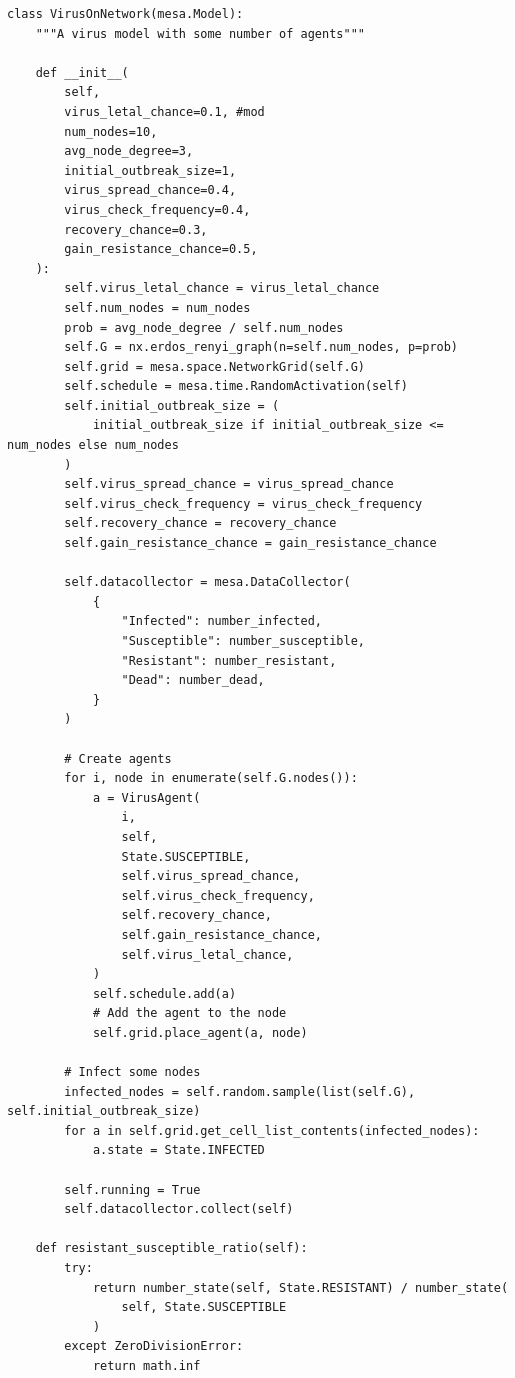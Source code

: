\begin{verbatim}
class VirusOnNetwork(mesa.Model):
    """A virus model with some number of agents"""

    def __init__(
        self,
        virus_letal_chance=0.1, #mod
        num_nodes=10,
        avg_node_degree=3,
        initial_outbreak_size=1,
        virus_spread_chance=0.4,
        virus_check_frequency=0.4,
        recovery_chance=0.3,
        gain_resistance_chance=0.5,
    ):
        self.virus_letal_chance = virus_letal_chance
        self.num_nodes = num_nodes
        prob = avg_node_degree / self.num_nodes
        self.G = nx.erdos_renyi_graph(n=self.num_nodes, p=prob)
        self.grid = mesa.space.NetworkGrid(self.G)
        self.schedule = mesa.time.RandomActivation(self)
        self.initial_outbreak_size = (
            initial_outbreak_size if initial_outbreak_size <= num_nodes else num_nodes
        )
        self.virus_spread_chance = virus_spread_chance
        self.virus_check_frequency = virus_check_frequency
        self.recovery_chance = recovery_chance
        self.gain_resistance_chance = gain_resistance_chance

        self.datacollector = mesa.DataCollector(
            {
                "Infected": number_infected,
                "Susceptible": number_susceptible,
                "Resistant": number_resistant,
                "Dead": number_dead,
            }
        )

        # Create agents
        for i, node in enumerate(self.G.nodes()):
            a = VirusAgent(
                i,
                self,
                State.SUSCEPTIBLE,
                self.virus_spread_chance,
                self.virus_check_frequency,
                self.recovery_chance,
                self.gain_resistance_chance,
                self.virus_letal_chance,
            )
            self.schedule.add(a)
            # Add the agent to the node
            self.grid.place_agent(a, node)

        # Infect some nodes
        infected_nodes = self.random.sample(list(self.G), self.initial_outbreak_size)
        for a in self.grid.get_cell_list_contents(infected_nodes):
            a.state = State.INFECTED

        self.running = True
        self.datacollector.collect(self)

    def resistant_susceptible_ratio(self):
        try:
            return number_state(self, State.RESISTANT) / number_state(
                self, State.SUSCEPTIBLE
            )
        except ZeroDivisionError:
            return math.inf


\end{verbatim}
